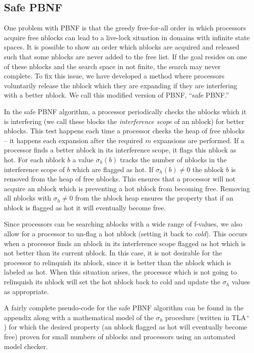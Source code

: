 \documentclass{article}
\begin{document}
\subsection{Safe PBNF}

One problem with PBNF is that the greedy free-for-all order in which
processors acquire free nblocks can lead to a live-lock situation in
domains with infinite state spaces.  It is possible to show an order
which nblocks are acquired and released such that some nblocks are
never added to the free list.  If the goal resides on one of these
nblocks and the search space in not finite, the search may never
complete.  To fix this issue, we have developed a method where
processors voluntarily release the nblock which they are expanding if
they are interfering with a better nblock.  We call this modified
version of PBNF, ``safe PBNF.''

In the safe PBNF algorithm, a processor periodically checks the
nblocks which it is interfering (we call these blocks the
\emph{interference scope} of an nblock) for better nblocks.  This test
happens each time a processor checks the heap of free nblocks -- it
happens each expansion after the required $m$ expansions are
performed.  If a processor finds a better nblock in its interference
scope, it flags this nblock as hot.  For each nblock $b$ a value
$\sigma_h(b)$ tracks the number of nblocks in the interference scope
of $b$ which are flagged as hot.  If $\sigma_h(b) \neq 0$ the nblock
$b$ is removed from the heap of free nblocks.  This ensures that a
processor will not acquire an nblock which is preventing a hot nblock
from becoming free.  Removing all nblocks with $\sigma_h \neq 0$ from
the nblock heap ensures the property that if an nblock is flagged as
hot it will eventually become free.

Since processors can be searching nblocks with a wide range of
f-values, we also allow for a processor to un-flag a hot nblock
(setting it back to \emph{cold}).  This occurs when a processor finds
an nblock in its interference scope flagged as hot which is not better
than its current nblock.  In this case, it is not desirable for the
processor to relinquish its nblock, since it is better than the nblock
which is labeled as hot.  When this situation arises, the processor
which is not going to relinquish its nblock will set the hot nblock
back to cold and update the $\sigma_h$ values as appropriate.

A fairly complete pseudo-code for the safe PBNF algorithm can be found
in the appendix along with a mathematical model of the $\sigma_h$
procedure (written in TLA$^+$) for which the desired property (an
nblock flagged as hot will eventually become free) proven for small
numbers of nblocks and processors using an automated model checker.
\end{document}
